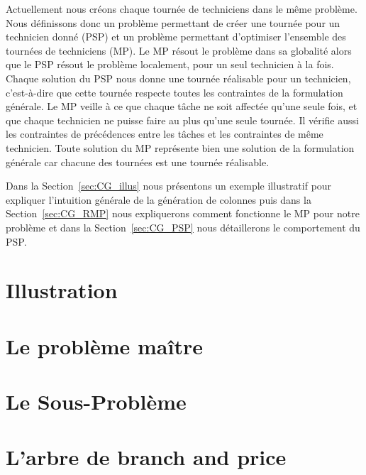 Actuellement nous créons chaque tournée de techniciens dans le même problème.
Nous définissons donc un problème permettant de créer une tournée pour un technicien donné (PSP) et un problème permettant d'optimiser l'ensemble des tournées de techniciens (MP).
Le MP résout le problème dans sa globalité alors que le PSP résout le problème localement, pour un seul technicien à la fois. Chaque solution du PSP nous donne une tournée réalisable pour un technicien, c'est-à-dire que cette tournée respecte toutes les contraintes de la formulation générale.
Le MP veille à ce que chaque tâche ne soit affectée qu'une seule fois, et que chaque technicien ne puisse faire au plus qu'une seule tournée. Il vérifie aussi les contraintes de précédences entre les tâches et les contraintes de même technicien.
Toute solution du MP représente bien une solution de la formulation générale car chacune des tournées est une tournée réalisable.

Dans la Section~\ref{sec:CG_illus} nous présentons un exemple illustratif pour expliquer l'intuition générale de la génération de colonnes puis dans la Section~\ref{sec:CG_RMP} nous expliquerons comment fonctionne le MP pour notre problème et dans la Section~\ref{sec:CG_PSP} nous détaillerons le comportement du PSP. 




\section{Illustration \label{sec:CG_illus}}



\section{Le problème maître \label{sec:CG_RMP}}



\section{Le Sous-Problème\label{sec:CG_PSP}}



\section{L'arbre de branch and price \label{sec:CG_BP}}


